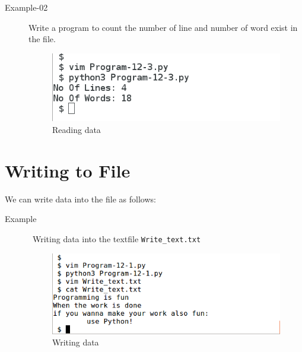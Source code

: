 \documentclass[11pt,a4paper]{article}
\begin{document}
\begin{description}
\item [Example-02 ] Write a program to count the number of line and number of word exist in the file.


\begin{figure}[ht]
\begin{center}
\includegraphics[scale=0.5]{Output-12-3.png}
\caption{Reading data}
\label{Reading data}
\end{center}
\end{figure}
\end{description}

\section*{Writing to File}
We can write data into the file as follows:
\begin{description}
\item[Example ]\ Writing data into the textfile \texttt{Write\_text.txt}


\begin{figure}[ht]
\begin{center}
\includegraphics[scale=0.5]{Output-12-1.png}
\caption{Writing data}
\label{Writing data}
\end{center}
\end{figure}
\end{description}
\end{document}

